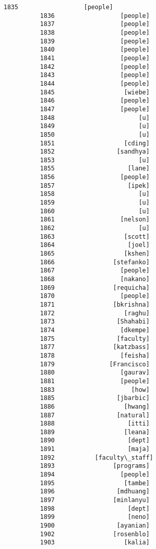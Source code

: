 \documentclass[11pt]{article}
\begin{document}
\begin{Verbatim}[commandchars=\\\{\}]
          1835                  [people]
          1836                  [people]
          1837                  [people]
          1838                  [people]
          1839                  [people]
          1840                  [people]
          1841                  [people]
          1842                  [people]
          1843                  [people]
          1844                  [people]
          1845                   [wiebe]
          1846                  [people]
          1847                  [people]
          1848                       [u]
          1849                       [u]
          1850                       [u]
          1851                   [cding]
          1852                 [sandhya]
          1853                       [u]
          1855                    [lane]
          1856                  [people]
          1857                    [ipek]
          1858                       [u]
          1859                       [u]
          1860                       [u]
          1861                  [nelson]
          1862                       [u]
          1863                   [scott]
          1864                    [joel]
          1865                   [kshen]
          1866                [stefanko]
          1867                  [people]
          1868                  [nakano]
          1869                [requicha]
          1870                  [people]
          1871                [bkrishna]
          1872                   [raghu]
          1873                 [Shahabi]
          1874                  [dkempe]
          1875                 [faculty]
          1877                [katzbass]
          1878                  [feisha]
          1879               [Francisco]
          1880                  [gaurav]
          1881                  [people]
          1883                     [how]
          1885                 [jbarbic]
          1886                   [hwang]
          1887                 [natural]
          1888                    [itti]
          1889                   [leana]
          1890                    [dept]
          1891                    [maja]
          1892           [faculty\_staff]
          1893                [programs]
          1894                  [people]
          1895                   [tambe]
          1896                 [mdhuang]
          1897                [minlanyu]
          1898                    [dept]
          1899                    [neno]
          1900                 [ayanian]
          1902                [rosenblo]
          1903                   [kalia]

\end{Verbatim}
\end{document}
